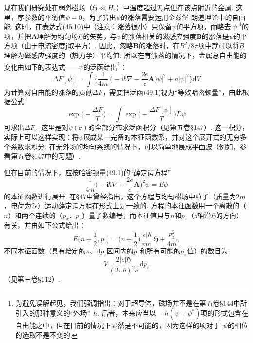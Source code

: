 现在我们研究处在弱外磁场（$\mathfrak{H}\ll H_{\mathrm{c}}$）中温度超过$T_{\mathrm{c}}$点但在该点附近的金属. 这里，序参数的平衡值$\psi=0$，为了算出$\psi$的涨落需要运用金兹堡-朗道理论中的自由能. 这时，在表达式(45.10)中（注意：涨落很小）只保留$\psi$的平方项，而略去$|\psi|^4$的项，并把$\bm{A}$理解为均匀场$\mathfrak{H}$的矢势，与$\psi$的涨落相关的磁感应强度$\bm{B}$的涨落是$\psi$的平方项（由于电流密度$\bm{j}$取平方）. 因此，忽略$\bm{B}$的涨落时，在$B^2/8\pi$项中就可以将$B$理解为磁感应强度的（热力学）平均值. 所以在有涨落的情况下，金属总自由能的变化由如下的表达式——$\psi$的泛函给出\footnote{为避免误解起见，我们强调指出：对于超导体，磁场并不是在第五卷§144中所引入的那种意义的“外场”~$h$. 后者，本来应当以~$-h(\psi+\psi^{*})$项的形式包含在自由能之中，但在目前的情况下显然是不可能的，因为这样的项对于~$\psi$的相位的选取不是不变的.}：
\begin{equation}
\Delta F[\psi]=\int\biggl\{\frac{1}{4m}
\biggl|\biggl(-\mathrm{i}\hbar\nabla-\frac{2e}{c}\bm{A}\biggr)\psi\biggr|^2
+a|\psi|^2\biggr\}\mathrm{d}V
\end{equation}
为计算对自由能的涨落的贡献$\Delta F$，需要把泛函(49.1)视为“等效哈密顿量”，由此根据公式
\begin{equation}
\exp\biggl(-\frac{\Delta F}{T}\biggr)
=\int\exp\biggl(-\frac{\Delta F[\psi]}{T}\biggr)D\psi
\end{equation}
可求出$\Delta F$，这里是对$\psi(\bm{r})$的全部分布求泛函积分（见第五卷§147）. 这一积分，实际上可以这样实现：将$\psi$展成某一完备的本征函数系，并对这个展开式的无穷多个系数求积分. 在无外场的均匀系统的情况下，可以简单地展成平面波（例如，参看第五卷§147中的习题）.

但在目前的情况下，应按哈密顿量(49.1)的“薛定谔方程”
\begin{equation}
\frac{1}{4m}\biggl(-\mathrm{i}\hbar\nabla-\frac{2e}{c}\bm{A}\biggr)^{\!2}\psi=E\psi
\end{equation}
的本征函数进行展开. 在§47中曾经指出，这个方程与均匀磁场中粒子（质量为$2m$，电荷为$2e$）运动薛定谔方程在形式上是一致的. 方程的本征函数用一个离散的（$n$）和两个连续的（$p_x$、$p_z$）量子数编号，而本征值只与$n$和$p_z$（$z$轴沿$\mathfrak{H}$的方向）有关，并由如下公式给出：
\begin{equation}
E\biggl(n+\frac{1}{2},p_z\biggr)=\biggl(n+\frac{1}{2}\biggr)\frac{|e|\hbar}{mc}\,\mathfrak{H}
+\frac{p_z^2}{4m},
\end{equation}
不同本征函数（具有给定的$n$、$\mathrm{d}p_z$区间内的$p_z$和所有可能的$p_x$值）的数目为
\begin{equation*}
V\,\frac{2|e|\mathfrak{H}}{(2\pi\hbar)^2c}\,\mathrm{d}p_z
\end{equation*}
（见第三卷§112）.

